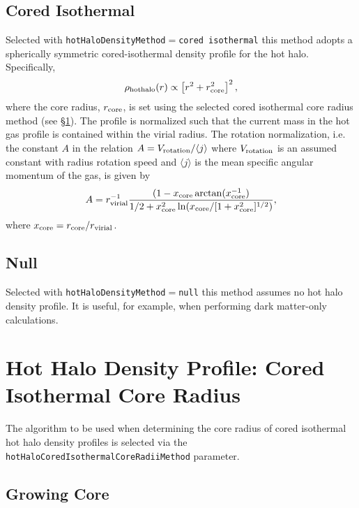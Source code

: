\subsection{Cored Isothermal}

Selected with {\tt hotHaloDensityMethod}$=${\tt cored isothermal} this method adopts a spherically symmetric cored-isothermal density profile for the hot halo. Specifically,
\begin{equation}
 \rho_{\rm hot halo}(r) \propto \left[ r^2 + r_{\rm core}^2 \right]^2,
\end{equation}
where the core radius, $r_{\rm core}$, is set using the selected cored isothermal core radius method (see \S\ref{sec:hotHaloDensityProfileCoredIsothermalCoreRadius}). The profile is normalized such that the current mass in the hot gas profile is contained within the virial radius. The rotation normalization, i.e. the constant $A$ in the relation $A = V_{\rm rotation}/\langle j \rangle$ where $V_{\rm rotation}$ is an assumed constant with radius rotation speed and $\langle j \rangle$ is the mean specific angular momentum of the gas, is given by
\begin{equation}
A = r_{\rm virial}^{-1} {(1-x_{\rm core}\arctan(x_{\rm core}^{-1}) \over 1/2 + x_{\rm core}^2 \ln(x_{\rm core}/[1+x_{\rm core}^2]^{1/2})},
\end{equation}
where $x_{\rm core}=r_{\rm core}/r_{\rm virial}$.

\subsection{Null}

Selected with {\tt hotHaloDensityMethod}$=${\tt null} this method assumes no hot halo density profile. It is useful, for example, when performing dark matter-only calculations.

\section{Hot Halo Density Profile: Cored Isothermal Core Radius}\label{sec:hotHaloDensityProfileCoredIsothermalCoreRadius}

The algorithm to be used when determining the core radius of cored isothermal hot halo density profiles is selected via the {\tt hotHaloCoredIsothermalCoreRadiiMethod} parameter.

\subsection{Growing Core}

